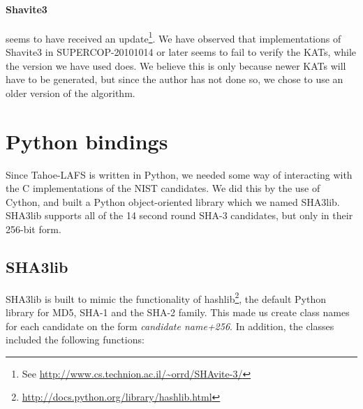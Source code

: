 \documentclass[english,12pt,a4paper]{book}
\begin{document}
\paragraph{Shavite3} seems to have received an update\footnote{See
\url{http://www.cs.technion.ac.il/~orrd/SHAvite-3/}}. We have observed that
implementations of Shavite3 in \ac{SUPERCOP}-20101014 or later seems to fail to
verify the \acp{KAT}, while the version we have used does. We believe this is
only because newer \acp{KAT} will have to be generated, but since the author
has not done so, we chose to use an older version of the algorithm.

\section{Python bindings}

Since Tahoe-\ac{LAFS} is written in Python, we needed some way of interacting
with the C implementations of the \ac{NIST} candidates. We did this by the use of
Cython, and built a Python object-oriented library which we named SHA3lib.
SHA3lib supports all of the 14 second round \ac{SHA}-3 candidates, but only in
their 256-bit form.

\subsection{SHA3lib}

SHA3lib is built to mimic the functionality of
hashlib\footnote{\url{http://docs.python.org/library/hashlib.html}}, the
default Python library for MD5, \ac{SHA}-1 and the \ac{SHA}-2 family. This
made us create class names for each candidate on the form
\emph{candidate name+256}. In addition, the classes included the following
functions:

\end{document}
